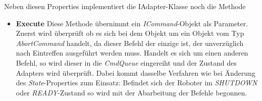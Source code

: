 Neben diesen Properties implementiert die IAdapter-Klasse noch die Methode
\begin{itemize}
\item \textbf{Execute}
\newline
Diese Methode übernimmt ein \textit{ICommand}-Objekt als Parameter. Zuerst wird überprüft ob es sich bei dem Objekt um ein Objekt vom Typ \textit{AbortCommand} handelt, da dieser Befehl der einzige ist, der unverzüglich nach Eintreffen ausgeführt werden muss. Handelt es sich um einen anderen Befehl, so wird dieser in die \textit{CmdQueue} eingereiht und der Zustand des Adapters wird überprüft. Dabei kommt dasselbe Verfahren wie bei Änderung des \textit{State}-Properties zum Einsatz: Befindet sich der Roboter im \textit{SHUTDOWN} oder \textit{READY}-Zustand so wird mit der Abarbeitung der Befehle begonnen.
\end{itemize}

